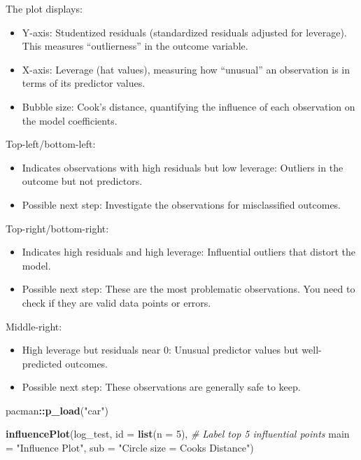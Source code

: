 \documentclass[
]{article}
\newenvironment{Shaded}{\begin{snugshade}}{\end{snugshade}}
\newcommand{\AttributeTok}[1]{\textcolor[rgb]{0.13,0.29,0.53}{#1}}
\newcommand{\CommentTok}[1]{\textcolor[rgb]{0.56,0.35,0.01}{\textit{#1}}}
\newcommand{\DecValTok}[1]{\textcolor[rgb]{0.00,0.00,0.81}{#1}}
\newcommand{\FunctionTok}[1]{\textcolor[rgb]{0.13,0.29,0.53}{\textbf{#1}}}
\newcommand{\NormalTok}[1]{#1}
\newcommand{\SpecialCharTok}[1]{\textcolor[rgb]{0.81,0.36,0.00}{\textbf{#1}}}
\newcommand{\StringTok}[1]{\textcolor[rgb]{0.31,0.60,0.02}{#1}}
\begin{document}
The plot displays:

\begin{itemize}
\item
  Y-axis: Studentized residuals (standardized residuals adjusted for
  leverage). This measures ``outlierness'' in the outcome variable.
\item
  X-axis: Leverage (hat values), measuring how ``unusual'' an
  observation is in terms of its predictor values.
\item
  Bubble size: Cook's distance, quantifying the influence of each
  observation on the model coefficients.
\end{itemize}

Top-left/bottom-left:

\begin{itemize}
\item
  Indicates observations with high residuals but low leverage: Outliers
  in the outcome but not predictors.
\item
  Possible next step: Investigate the observations for misclassified
  outcomes.
\end{itemize}

Top-right/bottom-right:

\begin{itemize}
\item
  Indicates high residuals and high leverage: Influential outliers that
  distort the model.
\item
  Possible next step: These are the most problematic observations. You
  need to check if they are valid data points or errors.
\end{itemize}

Middle-right:

\begin{itemize}
\item
  High leverage but residuals near 0: Unusual predictor values but
  well-predicted outcomes.
\item
  Possible next step: These observations are generally safe to keep.
\end{itemize}

\begin{Shaded}
\begin{Highlighting}[]
\NormalTok{pacman}\SpecialCharTok{::}\FunctionTok{p\_load}\NormalTok{(}\StringTok{"car"}\NormalTok{)}

\FunctionTok{influencePlot}\NormalTok{(log\_test, }
              \AttributeTok{id =} \FunctionTok{list}\NormalTok{(}\AttributeTok{n =} \DecValTok{5}\NormalTok{),  }\CommentTok{\# Label top 5 influential points}
              \AttributeTok{main =} \StringTok{"Influence Plot"}\NormalTok{,}
              \AttributeTok{sub =} \StringTok{"Circle size = Cook\textquotesingle{}s Distance"}\NormalTok{)}
\end{Highlighting}
\end{Shaded}
\end{document}

